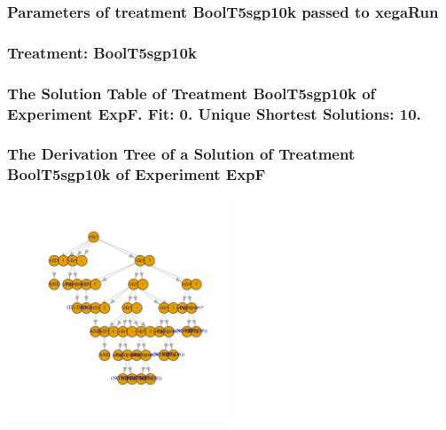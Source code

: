 \documentclass[18pt,c]{beamer}
\begin{document}
 \begin{frame}
 \fontsize{8pt}{9pt}\selectfont
 \frametitle{  Parameters of treatment BoolT5sgp10k passed to xegaRun
 }

 \label{ExpFtParmTable003.tex}  
 \end{frame}

 \begin{frame}
 \fontsize{8pt}{9pt}\selectfont
 \frametitle{ Treatment: BoolT5sgp10k }

 \label{ExpFStatsTable006.tex}  
 \end{frame}

 \begin{frame}
 \fontsize{8pt}{9pt}\selectfont
 \frametitle{ The Solution Table of Treatment BoolT5sgp10k of Experiment ExpF. Fit: 0. Unique Shortest Solutions: 10. }

 \label{ExpFSolutionTable000.tex}  
 \end{frame}

 \begin{frame}
 \frametitle{ The Derivation Tree of a Solution of Treatment BoolT5sgp10k of Experiment ExpF }
 \begin{center}
\includegraphics[width=0.5\textwidth, angle=0]
{ExpFDerivationTreeFigure000.pdf}
 \end{center}
 \label{report/ExpFDerivationTreeFigure000.pdf}  
 \end{frame}
\end{document}
